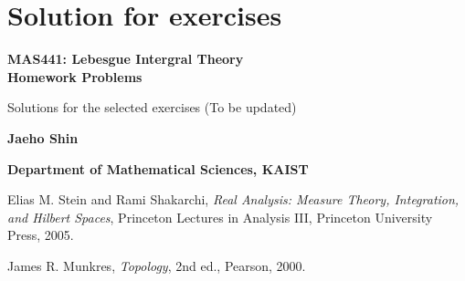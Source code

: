 \documentclass[12pt, a4paper, openany, twoside]{book}
\theoremstyle{definition}
\theoremstyle{remark}
\theoremstyle{plain}
\numberwithin{equation}{section}
\begin{document}
\chapter{Solution for exercises}
\begin{center}
    \vspace*{4cm}
        
    \Huge
    \textbf{MAS441: Lebesgue Intergral Theory\\\vspace{2mm}
    Homework Problems}

    \vspace{1cm}
    \large
    Solutions for the selected exercises (To be updated)
    \vspace{3cm}
    
    \LARGE
    \textbf{Jaeho Shin}
        
    \vspace{5cm}
        
    \normalsize
    \textbf{Department of Mathematical Sciences, KAIST}\\  
\end{center}

\newpage

\begin{thebibliography}{99}

Elias M. Stein and Rami Shakarchi,
\textit{Real Analysis: Measure Theory, Integration, and Hilbert Spaces},
Princeton Lectures in Analysis III, Princeton University Press, 2005.

James R. Munkres,  
\textit{Topology},  
2nd ed., Pearson, 2000.

\end{thebibliography}
\end{document}
